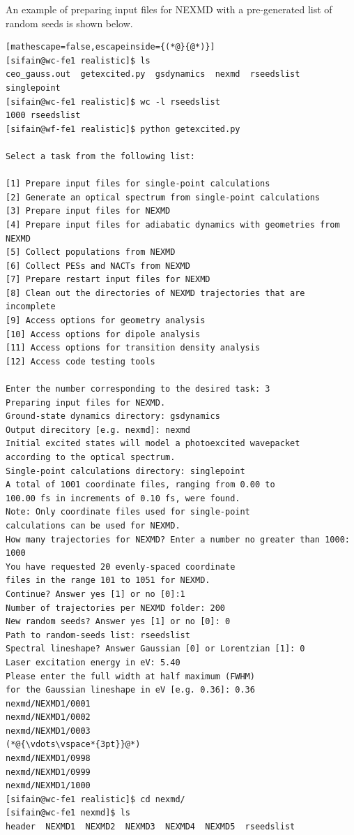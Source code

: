 \documentclass[letterpaper,12pt,titlepage]{article}
\begin{document}
\noindent An example of preparing input files for NEXMD with a pre-generated list of random seeds is shown below.
\begin{lstlisting}[mathescape=false,escapeinside={(*@}{@*)}]
[sifain@wc-fe1 realistic]$ ls
ceo_gauss.out  getexcited.py  gsdynamics  nexmd  rseedslist  singlepoint
[sifain@wc-fe1 realistic]$ wc -l rseedslist 
1000 rseedslist
[sifain@wf-fe1 realistic]$ python getexcited.py 

Select a task from the following list:

[1] Prepare input files for single-point calculations
[2] Generate an optical spectrum from single-point calculations
[3] Prepare input files for NEXMD
[4] Prepare input files for adiabatic dynamics with geometries from NEXMD
[5] Collect populations from NEXMD
[6] Collect PESs and NACTs from NEXMD
[7] Prepare restart input files for NEXMD
[8] Clean out the directories of NEXMD trajectories that are incomplete
[9] Access options for geometry analysis
[10] Access options for dipole analysis
[11] Access options for transition density analysis
[12] Access code testing tools

Enter the number corresponding to the desired task: 3
Preparing input files for NEXMD.
Ground-state dynamics directory: gsdynamics
Output direcitory [e.g. nexmd]: nexmd 
Initial excited states will model a photoexcited wavepacket 
according to the optical spectrum.
Single-point calculations directory: singlepoint
A total of 1001 coordinate files, ranging from 0.00 to 
100.00 fs in increments of 0.10 fs, were found.
Note: Only coordinate files used for single-point 
calculations can be used for NEXMD.
How many trajectories for NEXMD? Enter a number no greater than 1000: 1000
You have requested 20 evenly-spaced coordinate 
files in the range 101 to 1051 for NEXMD.
Continue? Answer yes [1] or no [0]:1
Number of trajectories per NEXMD folder: 200
New random seeds? Answer yes [1] or no [0]: 0
Path to random-seeds list: rseedslist
Spectral lineshape? Answer Gaussian [0] or Lorentzian [1]: 0
Laser excitation energy in eV: 5.40
Please enter the full width at half maximum (FWHM) 
for the Gaussian lineshape in eV [e.g. 0.36]: 0.36
nexmd/NEXMD1/0001
nexmd/NEXMD1/0002
nexmd/NEXMD1/0003
(*@{\vdots\vspace*{3pt}}@*)
nexmd/NEXMD1/0998
nexmd/NEXMD1/0999
nexmd/NEXMD1/1000
[sifain@wc-fe1 realistic]$ cd nexmd/
[sifain@wc-fe1 nexmd]$ ls
header  NEXMD1  NEXMD2  NEXMD3  NEXMD4  NEXMD5  rseedslist
\end{lstlisting}
\end{document}
